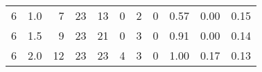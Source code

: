 \begin{tabular}{rrrrrrrrrrr}
                     6 &                        1.0 &                                  7 &                       23 &                      13 &                            0 &                         2 &                        0 &                          0.57 &                                0.00 &                                 0.15 \\
                     6 &                        1.5 &                                  9 &                       23 &                      21 &                            0 &                         3 &                        0 &                          0.91 &                                0.00 &                                 0.14 \\
                     6 &                        2.0 &                                 12 &                       23 &                      23 &                            4 &                         3 &                        0 &                          1.00 &                                0.17 &                                 0.13 \\
\bottomrule
\end{tabular}
